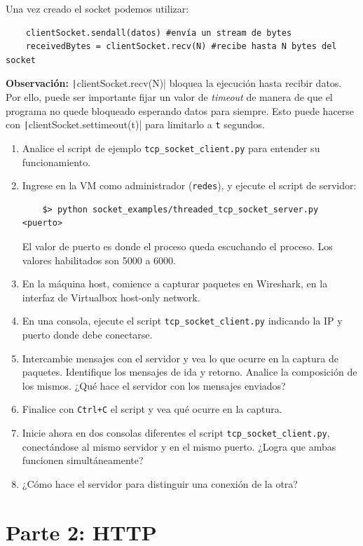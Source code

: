 \documentclass[a4paper,10pt]{article}
\begin{document}
Una vez creado el socket podemos utilizar:
\begin{verbatim}
    clientSocket.sendall(datos) #envía un stream de bytes
    receivedBytes = clientSocket.recv(N) #recibe hasta N bytes del socket
\end{verbatim}

\textbf{Observación:} \texttt|clientSocket.recv(N)| bloquea la ejecución hasta recibir datos. Por ello, puede ser importante fijar un valor de \emph{timeout} de manera de que el programa no quede bloqueado esperando datos para siempre. Esto puede hacerse con \texttt|clientSocket.settimeout(t)| para limitarlo a \texttt{t} segundos.


\begin{enumerate}
    \item Analice el script de ejemplo \texttt{tcp\_socket\_client.py} para entender su funcionamiento.
    \item Ingrese en la VM como administrador (\texttt{redes}), y ejecute el script de servidor:
    \begin{verbatim}
    $> python socket_examples/threaded_tcp_socket_server.py <puerto>
    \end{verbatim}
    El valor de puerto es donde el proceso queda escuchando el proceso. Los valores habilitados son 5000 a 6000.
    \item En la máquina host, comience a capturar paquetes en Wireshark, en la interfaz de Virtualbox host-only network.
    \item En una consola, ejecute el script \texttt{tcp\_socket\_client.py} indicando la IP y puerto donde debe conectarse.
    \item Intercambie mensajes con el servidor y vea lo que ocurre en la captura de paquetes. Identifique los mensajes de ida y retorno. Analice la composición de los mismos. ¿Qué hace el servidor con los mensajes enviados?
    \item Finalice con \texttt{Ctrl+C} el script y vea qué ocurre en la captura.
    \item Inicie ahora en dos consolas diferentes el script \texttt{tcp\_socket\_client.py}, conectándose al mismo servidor y en el mismo puerto. ¿Logra que ambas funcionen simultáneamente?
    \item ¿Cómo hace el servidor para distinguir una conexión de la otra?
    
\end{enumerate}

\section*{Parte 2: HTTP}
\end{document}
